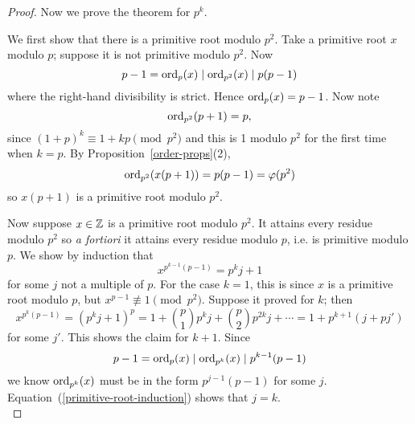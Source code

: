 \begin{proof}
Now we prove the theorem for $p^k$.

We first show that there %
is a primitive root modulo $p^2$. Take a primitive root $x$ modulo $p$; suppose it is not primitive modulo $p^2$. Now 
\[
p-1=\operatorname{ord}_p(x)\mid \operatorname{ord}_{p^2}(x)\mid p(p-1)
\]
where the right-hand divisibility is strict. Hence $\operatorname{ord}_p(x)=p-1$.
Now note 
\[\operatorname{ord}_{p^2}(p+1)=p,\]
since $(1+p)^k\equiv 1+kp\pmod{p^2}$ and this is 1 modulo $p^2$ for the first time when $k=p$.
By Proposition~\ref{order-props}(2), 
\[
\operatorname{ord}_{p^2}(x(p+1))=p(p-1)=\varphi(p^2)
\]
so $x(p+1)$ is a primitive root modulo $p^2$.

Now suppose $x\in \mathbb{Z}$ is a primitive root modulo $p^2$. It attains every residue modulo $p^2$ so {\it a fortiori} it attains every residue modulo $p$, i.e. is primitive modulo $p$. 
We show by induction that
\begin{equation}\label{primitive-root-induction}
x^{p^{k-1}(p-1)}=p^{k}j+1
\end{equation}
for some $j$ not a multiple of $p$. For the case $k=1$, this is since $x$ is a primitive root modulo $p$, but $x^{p-1}\nequiv 1\pmod{p^2}$. Suppose it proved for $k$; then
\[
x^{p^{k}(p-1)}=(p^kj+1)^p=1+\binom p1 p^kj+\binom p2p^{2k}j+\cdots
=1+p^{k+1}(j+pj')
\]
for some $j'$. This shows the claim for $k+1$. Since
\[
p-1=\operatorname{ord}_p(x)\mid \operatorname{ord}_{p^k}(x)\mid p^{k-1}(p-1)
\]
we know $\operatorname{ord}_{p^k}(x)$ must be in the form $p^{j-1}(p-1)$ for some $j$. Equation~(\ref{primitive-root-induction}) shows that $j=k$.\\
%

\end{proof}
